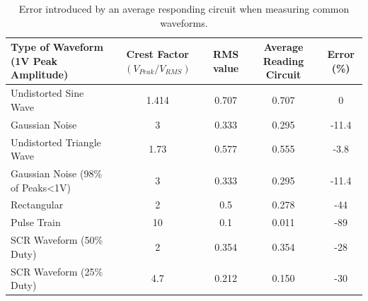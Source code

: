 \documentclass[10pt]{article}
\begin{document}
\begin{multicols*}{2}
                        \begin{table}[!th]
                            \centering
                            \begin{tabularx}{\textwidth}{|l*{4}{|C}|}
                                \hline
                                Type of Waveform (1V Peak Amplitude) & Crest Factor $(V_{Peak}/V_{RMS})$ & RMS value & Average Reading Circuit & Error (\%) \\ \hline
                                Undistorted Sine Wave & 1.414 & 0.707 & 0.707 & 0 \\    \hline
                                Gaussian Noise & 3 & 0.333 & 0.295 & -11.4 \\   \hline
                                Undistorted Triangle Wave & 1.73 & 0.577 & 0.555 & -3.8 \\   \hline
                                Gaussian Noise (98\% of Peaks<1V) & 3 & 0.333 & 0.295 & -11.4 \\    \hline
                                Rectangular & 2 & 0.5 & 0.278 & -44 \\    \hline
                                Pulse Train & 10 & 0.1 & 0.011 & -89 \\    \hline
                                SCR Waveform (50\% Duty) & 2 & 0.354 & 0.354 & -28 \\    \hline
                                SCR Waveform (25\% Duty) & 4.7 & 0.212 & 0.150 & -30 \\    \hline
                            \end{tabularx}
                            \caption{Error introduced by an average responding circuit when measuring common waveforms.}
                            \label{table:ave-err}
                        \end{table}


\end{multicols*}
\end{document}
